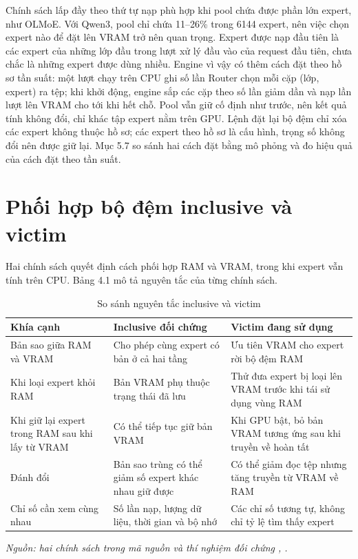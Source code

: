 Chính sách lấp đầy theo thứ tự nạp phù hợp khi pool chứa được phần lớn expert, như OLMoE. Với Qwen3, pool chỉ chứa 11--26\% trong 6144 expert, nên việc chọn expert nào để đặt lên VRAM trở nên quan trọng. Expert được nạp đầu tiên là các expert của những lớp đầu trong lượt xử lý đầu vào của request đầu tiên, chưa chắc là những expert được dùng nhiều. Engine vì vậy có thêm cách đặt theo hồ sơ tần suất: một lượt chạy trên CPU ghi số lần Router chọn mỗi cặp (lớp, expert) ra tệp; khi khởi động, engine sắp các cặp theo số lần giảm dần và nạp lần lượt lên VRAM cho tới khi hết chỗ. Pool vẫn giữ cố định như trước, nên kết quả tính không đổi, chỉ khác tập expert nằm trên GPU. Lệnh đặt lại bộ đệm chỉ xóa các expert không thuộc hồ sơ; các expert theo hồ sơ là cấu hình, trọng số không đổi nên được giữ lại. Mục 5.7 so sánh hai cách đặt bằng mô phỏng và đo hiệu quả của cách đặt theo tần suất.

\section{Phối hợp bộ đệm inclusive và victim}

Hai chính sách quyết định cách phối hợp RAM và VRAM, trong khi expert vẫn tính trên CPU. Bảng 4.1 mô tả nguyên tắc của từng chính sách.

\begin{table}[htbp]
\centering
\caption{So sánh nguyên tắc inclusive và victim}
\small
\setlength{\tabcolsep}{3pt}
\begin{tabularx}{\textwidth}{>{\RaggedRight\arraybackslash}p{3.5cm} >{\RaggedRight\arraybackslash}p{4cm} >{\RaggedRight\arraybackslash}X}
\toprule
\textbf{Khía cạnh} & \textbf{Inclusive đối chứng} & \textbf{Victim đang sử dụng} \\
\midrule
Bản sao giữa RAM và VRAM & Cho phép cùng expert có bản ở cả hai tầng & Ưu tiên VRAM cho expert rời bộ đệm RAM \\
Khi loại expert khỏi RAM & Bản VRAM phụ thuộc trạng thái đã lưu & Thử đưa expert bị loại lên VRAM trước khi tái sử dụng vùng RAM \\
Khi giữ lại expert trong RAM sau khi lấy từ VRAM & Có thể tiếp tục giữ bản VRAM & Khi GPU bật, bỏ bản VRAM tương ứng sau khi truyền về hoàn tất \\
Đánh đổi & Bản sao trùng có thể giảm số expert khác nhau giữ được & Có thể giảm đọc tệp nhưng tăng truyền từ VRAM về RAM \\
Chỉ số cần xem cùng nhau & Số lần nạp, lượng dữ liệu, thời gian và bộ nhớ & Các chỉ số tương tự, không chỉ tỷ lệ tìm thấy expert \\
\bottomrule
\end{tabularx}

\textit{Nguồn: hai chính sách trong mã nguồn và thí nghiệm đối chứng \cite{moe_tierengine_arch}, \cite{exp_web_session_i5}.}
\end{table}



